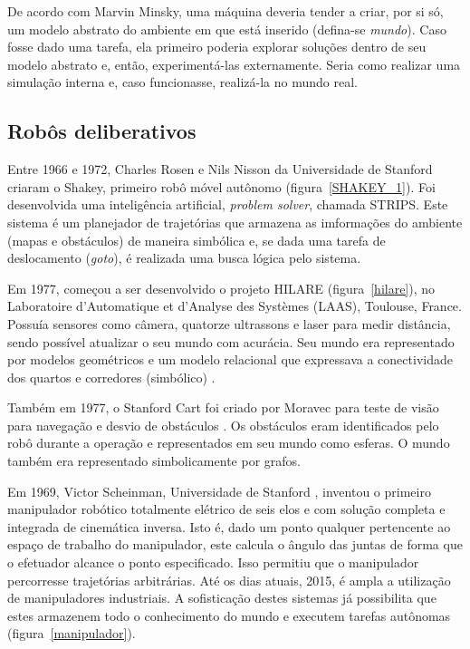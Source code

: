 De acordo com Marvin Minsky, uma máquina deveria tender a criar, por si só, um
modelo abstrato do ambiente em que está inserido (defina-se \emph{mundo}).
Caso fosse dado uma tarefa, ela primeiro poderia explorar soluções dentro de seu modelo abstrato e, então,
experimentá-las externamente. Seria como realizar uma simulação interna
e, caso funcionasse, realizá-la no mundo real.

\subsection{Robôs deliberativos}
Entre 1966 e 1972, Charles Rosen e Nils Nisson da Universidade de Stanford
criaram o Shakey, primeiro robô móvel autônomo (figura~\ref{SHAKEY_1}). Foi
desenvolvida uma inteligência artificial, \textit{problem solver}, chamada
STRIPS. Este sistema é um planejador de trajetórias que armazena as imformações
do ambiente (mapas e obstáculos) de maneira simbólica e, se dada uma tarefa de
deslocamento (\textit{goto}), é realizada uma busca lógica pelo sistema.

Em 1977, começou a ser desenvolvido o projeto HILARE (figura~\ref{hilare}), no
Laboratoire d'Automatique et d'Analyse des Systèmes (LAAS), Toulouse, France. Possuía sensores como câmera, quatorze ultrassons e laser para
medir distância, sendo possível atualizar o seu mundo com acurácia. Seu mundo
era representado por modelos geométricos e um modelo relacional que expressava a
conectividade dos quartos e corredores (simbólico) \cite{norelis1989control}.

Também em 1977, o Stanford Cart foi criado por Moravec para teste de visão
para navegação e desvio de obstáculos \cite{moravec1977towards}. Os obstáculos
eram identificados pelo robô durante a operação e representados em seu mundo
como esferas. O mundo também era representado simbolicamente por grafos.

Em 1969, Victor Scheinman, Universidade de Stanford
\cite{scheinman1969design}, inventou o primeiro manipulador robótico
totalmente elétrico de seis elos e com solução completa e integrada de
cinemática inversa. Isto é, dado um ponto qualquer pertencente ao espaço de
trabalho do manipulador, este calcula o ângulo das juntas de forma que o
efetuador alcance o ponto especificado. Isso permitiu que o manipulador
percorresse trajetórias arbitrárias. Até os dias atuais, 2015, é ampla a
utilização de manipuladores industriais. A sofisticação destes sistemas já
possibilita que estes armazenem todo o conhecimento do mundo e executem tarefas
autônomas (figura~\ref{manipulador}).

